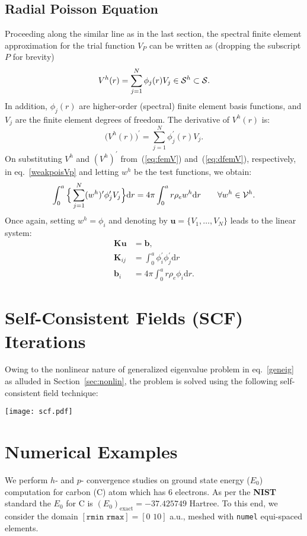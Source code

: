 \documentclass[12pt,dvipsnames]{article}
\newcommand{\eref}[1]{(\ref{#1})}
\newcommand{\vm}[1]{\mathbf{#1}}
\begin{document}
\subsection{Radial Poisson Equation}
Proceeding along the similar line as in the last section, the spectral finite element 
approximation for the trial function $V_P$ can be written as (dropping the subscript $P$ for brevity)
\begin{equation}	\label{eq:femV}
V^h (r) = \sum_{j=1}^N \phi_j(r) V_j \in {\cal S}^h \subset {\cal S}.
\end{equation}
In addition, $\phi_j(r)$ are higher-order (spectral) finite element 
basis functions, and $V_j$ are the finite element degrees of freedom. 
The derivative of $V^h(r)$ is:
\begin{equation}\label{eq:dfemV}
\bigl(V^h(r)\bigr)^\prime = \sum_{j=1}^N \phi_j^\prime (r) V_j.
\end{equation}
On substituting $V^h$ and $(V^h)^\prime$ from~\eref{eq:femV} and~\eref{eq:dfemV}, 
respectively, in eq.~\eqref{weakpoisVp} and letting $w^h$ be the test functions, we obtain:
\begin{equation*}
\int_0^a \Big\{ \sum_{j=1}^N (w^h)^\prime \phi_j^\prime V_j \Big\} \mathrm{d} r = 4 \pi \int_0^a r \rho_e w^h \mathrm{d} r \qquad \forall w^h \in {\cal V}^h.
\end{equation*}
Once again, setting $w^h = \phi_i$ and denoting by $\vm{u} = \{V_1, \ldots, V_N\}$ leads to the linear system:
\begin{subequations}\label{eq:linsys}
\begin{align}
\vm{K}\vm{u} &= \vm{b}, \\
\vm{K}_{ij} & = \int_0^a \phi_i^\prime \phi_j^\prime \mathrm{d} r \\
\vm{b}_i & = 4 \pi \int_0^a r \rho_e \phi_i \mathrm{d} r.
\end{align}
\end{subequations}
%
\newpage
\section{Self-Consistent Fields (SCF) Iterations}
Owing to the nonlinear nature of generalized eigenvalue problem in eq.~\eqref{geneig} as 
alluded in Section~\ref{sec:nonlin}, the problem is solved using the following self-consistent 
field technique:
\begin{center}
\texttt{[image: scf.pdf]}
\end{center}
%
%
\section{Numerical Examples}
We perform $h$- and $p$- convergence studies on ground state energy ($E_0$) computation for 
carbon (C) atom which has $6$ electrons. As per the {\bf NIST} standard the $E_0$ for C is $(E_0)_{\textrm{exact}} = -37.425749$ Hartree. 
To this end, we consider the domain $[\texttt{rmin} \, \, \texttt{rmax}] = [0 \, \, 10]$ a.u., meshed with \texttt{numel} equi-spaced 
elements.
%
\end{document}
